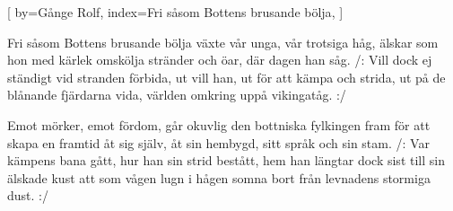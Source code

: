 

[
by={Gånge Rolf},
index={Fri såsom Bottens brusande bölja},
]

\beginverse*
Fri såsom Bottens brusande bölja
växte vår unga, vår trotsiga håg,
älskar som hon med kärlek omskölja
stränder och öar, där dagen han såg.
/: Vill dock ej ständigt vid stranden förbida,
ut vill han, ut för att kämpa och strida,
ut på de blånande fjärdarna vida,
världen omkring uppå vikingatåg. :/
\endverse

\beginverse* 
Emot mörker, emot fördom, går okuvlig den
bottniska fylkingen fram
för att skapa en framtid åt sig själv, 
åt sin hembygd, sitt språk och sin stam. 
/: Var kämpens bana gått, 
hur han sin strid bestått,
hem han längtar dock sist till sin älskade kust
att som vågen lugn i hågen somna bort från
levnadens stormiga dust. :/
\endverse
\endsong


